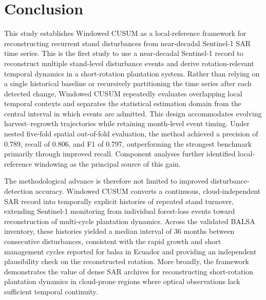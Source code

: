 \section{Conclusion}
\label{sec:conclusion}

This study establishes Windowed CUSUM as a local-reference framework for reconstructing recurrent stand disturbances from near-decadal Sentinel-1 SAR time series. This is the first study to use a near-decadal Sentinel-1 record to reconstruct multiple stand-level disturbance events and derive rotation-relevant temporal dynamics in a short-rotation plantation system. Rather than relying on a single historical baseline or recursively partitioning the time series after each detected change, Windowed CUSUM repeatedly evaluates overlapping local temporal contexts and separates the statistical estimation domain from the central interval in which events are admitted. This design accommodates evolving harvest--regrowth trajectories while retaining month-level event timing. Under nested five-fold spatial out-of-fold evaluation, the method achieved a precision of 0.789, recall of 0.806, and F1 of 0.797, outperforming the strongest benchmark primarily through improved recall. Component analyses further identified local-reference windowing as the principal source of this gain.



The methodological advance is therefore not limited to improved disturbance-detection accuracy. Windowed CUSUM converts a continuous, cloud-independent SAR record into temporally explicit histories of repeated stand turnover, extending Sentinel-1 monitoring from individual forest-loss events toward reconstruction of multi-cycle plantation dynamics. Across the validated BALSA inventory, these histories yielded a median interval of 36 months between consecutive disturbances, consistent with the rapid growth and short management cycles reported for balsa in Ecuador and providing an independent plausibility check on the reconstructed rotation. More broadly, the framework demonstrates the value of dense SAR archives for reconstructing short-rotation plantation dynamics in cloud-prone regions where optical observations lack sufficient temporal continuity.





